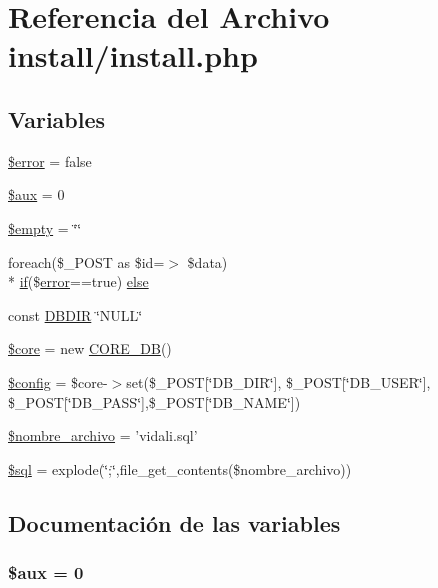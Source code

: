 \hypertarget{install_8php}{\section{Referencia del Archivo install/install.php}
\label{install_8php}
}
\subsection*{Variables}
\begin{DoxyCompactItemize}
\item 
\hyperlink{install_8php_aeba2ab722cedda53dbb7ec1a59f45550}{\$error} = false
\item 
\hyperlink{install_8php_a2ae48a97125d8c11d0a54961282b5a5b}{\$aux} = 0
\item 
\hyperlink{install_8php_a93eb7b714bc974fda90f7c51cff07173}{\$empty} = \char`\"{}\char`\"{}
\item 
foreach(\$\-\_\-\-P\-O\-S\-T as \$id=$>$ \$data) \\*
\hyperlink{index_8php_a03ed0eadab502a2cb754ef4963570e97}{if}(\$\hyperlink{classerror}{error}==true) \hyperlink{install_8php_a3d26c003999243f5a76e294d38107fec}{else}
\item 
const \hyperlink{install_8php_a66b4f44012d5c8f42e66b2bd34cf973b}{D\-B\-D\-I\-R} \char`\"{}N\-U\-L\-L\char`\"{}
\item 
\hyperlink{install_8php_aa432de3bacb7ced3632fa0ee0269ada3}{\$core} = new \hyperlink{classCORE__DB}{C\-O\-R\-E\-\_\-\-D\-B}()
\item 
\hyperlink{install_8php_a49c7011be9c979d9174c52a8b83e5d8e}{\$config} = \$core-\/$>$set(\$\-\_\-\-P\-O\-S\-T\mbox{[}\char`\"{}D\-B\-\_\-\-D\-I\-R\char`\"{}\mbox{]}, \$\-\_\-\-P\-O\-S\-T\mbox{[}\char`\"{}D\-B\-\_\-\-U\-S\-E\-R\char`\"{}\mbox{]}, \$\-\_\-\-P\-O\-S\-T\mbox{[}\char`\"{}D\-B\-\_\-\-P\-A\-S\-S\char`\"{}\mbox{]},\$\-\_\-\-P\-O\-S\-T\mbox{[}\char`\"{}D\-B\-\_\-\-N\-A\-M\-E\char`\"{}\mbox{]})
\item 
\hyperlink{install_8php_a83ccf54bab13094a0759c863e0e0ba08}{\$nombre\-\_\-archivo} = 'vidali.\-sql'
\item 
\hyperlink{install_8php_a047170d6020a882807665812a27e2525}{\$sql} = explode(\char`\"{};\char`\"{},file\-\_\-get\-\_\-contents(\$nombre\-\_\-archivo))
\end{DoxyCompactItemize}


\subsection{Documentación de las variables}
\hypertarget{install_8php_a2ae48a97125d8c11d0a54961282b5a5b}{
\subsubsection[{\$aux}]{\setlength{\rightskip}{0pt plus 5cm}\$aux = 0}}\label{install_8php_a2ae48a97125d8c11d0a54961282b5a5b}


